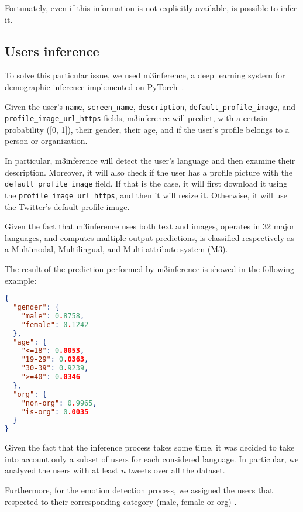 Fortunately, even if this information is not explicitly available, is possible to infer it. 

\subsection{Users inference}
\label{subsec:m3inference}

To solve this particular issue, we used m3inference, a deep learning system for demographic inference implemented on PyTorch~\cite{wang2019demographic}.

Given the user's \texttt{name}, \texttt{screen\_name}, \texttt{description}, \texttt{default\_profile\_image}, and \\
\texttt{profile\_image\_url\_https} fields, m3inference will predict, with a certain probability ([0, 1]), their gender, their age, and if the user's profile belongs to a person or organization.

In particular, m3inference will detect the user's language and then examine their description. Moreover, it will also check if the user has a profile picture with the \texttt{default\_profile\_image} field. If that is the case, it will first download it using the \texttt{profile\_image\_url\_https}, and then it will resize it. Otherwise, it will use the Twitter's default profile image. 

Given the fact that m3inference uses both text and images, operates in 32 major languages, and computes multiple output predictions, is classified respectively as a Multimodal, Multilingual, and Multi-attribute system (M3).

The result of the prediction performed by m3inference is showed in the following example:

\begin{lstlisting}[language=json, caption={Json object returned by m3inference}, captionpos=b, label={lst:m3inference-prediction}]
{
  "gender": {
    "male": 0.8758, 
    "female": 0.1242
  }, 
  "age": {
    "<=18": 0.0053, 
    "19-29": 0.0363, 
    "30-39": 0.9239, 
    ">=40": 0.0346
  }, 
  "org": {
    "non-org": 0.9965, 
    "is-org": 0.0035
  }
}
\end{lstlisting}

Given the fact that the inference process takes some time, it was decided to take into account only a subset of users for each considered language. In particular, we analyzed the users with at least \(n\) tweets over all the dataset. 

Furthermore, for the emotion detection process, we assigned the users that respected  to their corresponding category (male, female or org) .

